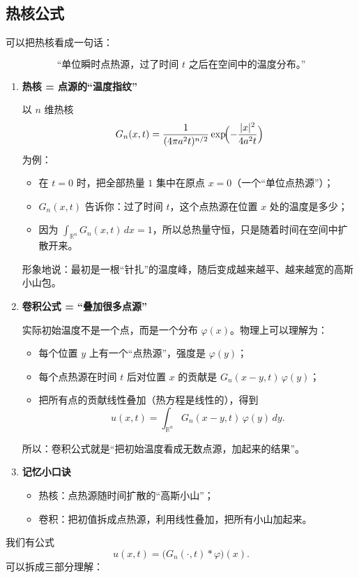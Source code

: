 \subsection{热核公式}
可以把热核看成一句话：

\[
\text{“单位瞬时点热源，过了时间 }t\text{ 之后在空间中的温度分布。”}
\]

\begin{enumerate}
  \item \textbf{热核 = 点源的“温度指纹”}

  以 $n$ 维热核
  \[
  G_n(x,t)=\frac1{(4\pi a^2 t)^{n/2}}\exp\!\Bigl(-\frac{|x|^2}{4a^2 t}\Bigr)
  \]
  为例：
  \begin{itemize}
    \item 在 $t=0$ 时，把全部热量 $1$ 集中在原点 $x=0$（一个“单位点热源”）；
    \item $G_n(x,t)$ 告诉你：过了时间 $t$，这个点热源在位置 $x$ 处的温度是多少；
    \item 因为 $\displaystyle\int_{\mathbb R^n} G_n(x,t)\,dx = 1$，所以总热量守恒，只是随着时间在空间中扩散开来。
  \end{itemize}

  形象地说：最初是一根“针扎”的温度峰，随后变成越来越平、越来越宽的高斯小山包。

  \item \textbf{卷积公式 = “叠加很多点源”}

  实际初始温度不是一个点，而是一个分布 $\varphi(x)$。物理上可以理解为：
  \begin{itemize}
    \item 每个位置 $y$ 上有一个“点热源”，强度是 $\varphi(y)$；
    \item 每个点热源在时间 $t$ 后对位置 $x$ 的贡献是 $G_n(x-y,t)\,\varphi(y)$；
    \item 把所有点的贡献线性叠加（热方程是线性的），得到
          \[
          u(x,t)=\int_{\mathbb R^n} G_n(x-y,t)\,\varphi(y)\,dy.
          \]
  \end{itemize}
  所以：卷积公式就是“把初始温度看成无数点源，加起来的结果”。

  \item \textbf{记忆小口诀}
  \begin{itemize}
    \item 热核：点热源随时间扩散的“高斯小山”；
    \item 卷积：把初值拆成点热源，利用线性叠加，把所有小山加起来。
  \end{itemize}
\end{enumerate}
\begin{dxtips}
    我们有公式
\[
u(x,t) = \bigl(G_n(\cdot,t)*\varphi\bigr)(x).
\]
可以拆成三部分理解：

\end{dxtips}
